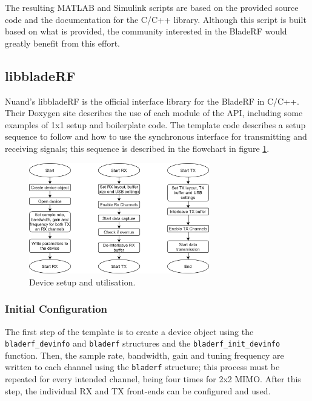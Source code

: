 \documentclass[12pt,a4paper]{report}
\begin{document}
The resulting MATLAB and Simulink scripts are based on the provided source code and the documentation for the C/C++ library. Although this script is built based on what is provided, the community interested in the BladeRF would greatly benefit from this effort.

\subsection{libbladeRF} \label{met:int:lib}
Nuand's libbladeRF is the official interface library for the BladeRF in C/C++. Their Doxygen site \cite{Nuand2019LibbladeRF2.2.1} describes the use of each module of the API, including some examples of 1x1 setup and boilerplate code. The template code describes a setup sequence to follow and how to use the synchronous interface for transmitting and receiving signals; this sequence is described in the flowchart in figure \ref{fig:flowchart}.

\begin{figure}[h]
    \centering
    \includegraphics[width = 0.7\textwidth]{Figures/bladerf_flowchart.png}
    \caption{Device setup and utilisation. \cite{Nuand2019LibbladeRF2.2.1}}
    \label{fig:flowchart}
\end{figure}

\subsubsection{Initial Configuration} \label{met:int:lib:init}
The first step of the template is to create a device object using the \verb|bladerf_devinfo| and \verb|bladerf| structures and the \verb|bladerf_init_devinfo| function. Then, the sample rate, bandwidth, gain and tuning frequency are written to each channel using the \verb|bladerf| structure; this process must be repeated for every intended channel, being four times for 2x2 MIMO. After this step, the individual RX and TX front-ends can be configured and used. \cite{Nuand2019LibbladeRF2.2.1}
\end{document}
